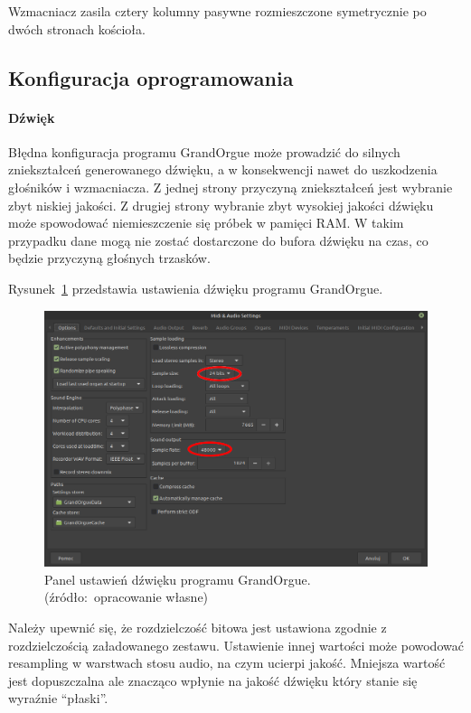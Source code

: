 \documentclass[11pt]{report}
\begin{document}
    Wzmacniacz zasila cztery kolumny pasywne rozmieszczone symetrycznie po dwóch stronach kościoła.

    \subsection{Konfiguracja oprogramowania}

    \paragraph{Dźwięk}
    Błędna konfiguracja programu GrandOrgue może prowadzić do silnych zniekształceń generowanego dźwięku, a w konsekwencji nawet do uszkodzenia głośników i wzmacniacza.
    Z jednej strony przyczyną zniekształceń jest wybranie zbyt niskiej jakości.
    Z drugiej strony wybranie zbyt wysokiej jakości dźwięku może spowodować niemieszczenie się próbek w pamięci RAM.
    W takim przypadku dane mogą nie zostać dostarczone do bufora dźwięku na czas, co będzie przyczyną głośnych trzasków.

    Rysunek~\ref{fig:ustawienia-dzwieku} przedstawia ustawienia dźwięku programu GrandOrgue.
    \begin{figure}[!ht]
        \centering
        \includegraphics[width=\linewidth]{fig/optionsR.png}
        \caption{Panel ustawień dźwięku programu GrandOrgue. (źródło:~opracowanie własne)}
        \label{fig:ustawienia-dzwieku}
    \end{figure}

    Należy upewnić się, że rozdzielczość bitowa jest ustawiona zgodnie z rozdzielczością załadowanego zestawu.
    Ustawienie innej wartości może powodować resampling w warstwach stosu audio, na czym ucierpi jakość.
    Mniejsza wartość jest dopuszczalna ale znacząco wpłynie na jakość dźwięku który stanie się wyraźnie ``płaski''.
\end{document}
